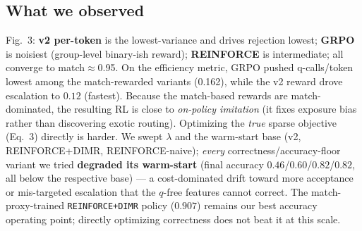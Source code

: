 \documentclass[11pt]{article}
\begin{document}
\subsection{What we observed}
Fig.~3: \textbf{v2 per-token} is the lowest-variance and drives rejection lowest; \textbf{GRPO} is
noisiest (group-level binary-ish reward); \textbf{REINFORCE} is intermediate; all converge to
match$\approx$0.95. On the efficiency metric, GRPO pushed q-calls/token lowest among the
match-rewarded variants (0.162), while the v2 reward drove escalation to $0.12$ (fastest). Because
the match-based rewards are match-dominated, the resulting RL is close to \emph{on-policy imitation}
(it fixes exposure bias rather than discovering exotic routing). Optimizing the \emph{true} sparse
objective (Eq.~3) directly is harder. We swept $\lambda$ and the warm-start base (v2, REINFORCE+DIMR,
REINFORCE-naive); \emph{every} correctness/accuracy-floor variant we tried \textbf{degraded its
warm-start} (final accuracy $0.46$/$0.60$/$0.82$/$0.82$, all below the respective base) --- a
cost-dominated drift toward more acceptance or mis-targeted escalation that the $q$-free features
cannot correct. The match-proxy-trained \texttt{REINFORCE+DIMR} policy ($0.907$) remains our best
accuracy operating point; directly optimizing correctness does not beat it at this scale.
\end{document}
